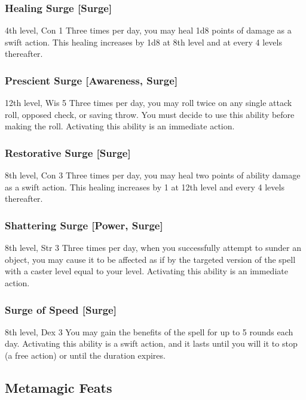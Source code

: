 \subsubsection{Healing Surge [Surge]}
\featpre 4th level, Con 1
\featben Three times per day, you may heal 1d8 points of damage as a swift action. This healing increases by 1d8 at 8th level and at every 4 levels thereafter.

\subsubsection{Prescient Surge [Awareness, Surge]}
\featpre 12th level, Wis 5
\featben Three times per day, you may roll twice on any single attack roll, opposed check, or saving throw. You must decide to use this ability before making the roll. Activating this ability is an immediate action.

\subsubsection{Restorative Surge [Surge]}
\featpre 8th level, Con 3
\featben Three times per day, you may heal two points of ability damage as a swift action. This healing increases by 1 at 12th level and every 4 levels thereafter.

\subsubsection{Shattering Surge [Power, Surge]}
\featpre 8th level, Str 3
\featben Three times per day, when you successfully attempt to sunder an object, you may cause it to be affected as if by the targeted version of the  spell with a caster level equal to your level. Activating this ability is an immediate action.

\subsubsection{Surge of Speed [Surge]}
\featpre 8th level, Dex 3
\featben You may gain the benefits of the  spell for up to 5 rounds each day. Activating this ability is a swift action, and it lasts until you will it to stop (a free action) or until the duration expires.

\subsection{Metamagic Feats}

